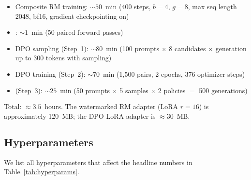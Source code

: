 \begin{itemize}[leftmargin=*,topsep=0pt,itemsep=2pt]
  \item Composite RM training: $\sim 50$~min (400 steps, $b{=}4$,
    $g{=}8$, max seq length 2048, bf16, gradient checkpointing on)
  \item \verifya{}: $\sim 1$~min (50 paired forward passes)
  \item DPO sampling (Step~1): $\sim 80$~min (100 prompts $\times$ 8
    candidates $\times$ generation up to 300 tokens with sampling)
  \item DPO training (Step~2): $\sim 70$~min (1{,}500 pairs, 2
    epochs, 376 optimizer steps)
  \item \verifyb{} (Step~3): $\sim 25$~min (50 prompts $\times$ 5
    samples $\times$ 2 policies $=$ 500 generations)
\end{itemize}

Total: $\approx 3.5$~hours. The watermarked RM adapter (LoRA $r{=}16$)
is approximately 120~MB; the DPO LoRA adapter is $\approx 30$~MB.

\subsection{Hyperparameters}

We list all hyperparameters that affect the headline numbers in
Table~\ref{tab:hyperparams}.

